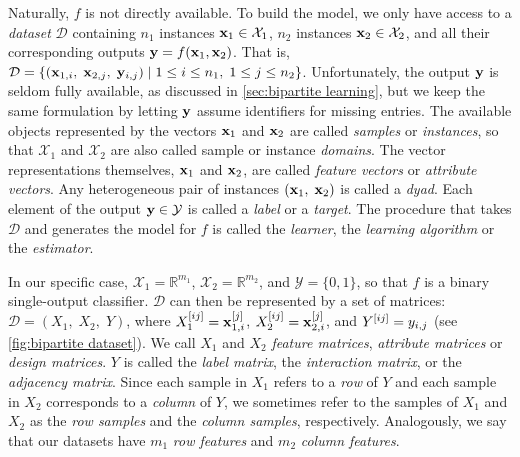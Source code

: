 Naturally, $f$ is not directly available. To build the model,
we only have access to a \emph{dataset} $\mathcal{D}$ containing $n_1$ instances $\mathbf{x}_{1} \in \mathcal{X}_1$, $n_2$ instances $\mathbf{x}_{2} \in \mathcal{X}_2$, and all their corresponding outputs $\mathbf{y} = f(\mathbf{x}_1, \mathbf{x}_2)$. That is,
$\mathcal{D} = \{(\mathbf{x}_{1,i}, \; \mathbf{x}_{2,j},\; \mathbf{y}_{i,j} ) \mid 1 \le i \le n_1,\; 1 \le j \le n_2\}$.
%
Unfortunately, the output $\mathbf{y}$ is seldom fully available, as discussed in \autoref{sec:bipartite learning}, but we keep the same formulation by letting $\mathbf{y}$ assume identifiers for missing entries.
%
%
%
%
The available objects represented by the vectors $\mathbf{x}_1$ and $\mathbf{x}_2$ are called \emph{samples} or \emph{instances}, so that $\mathcal{X}_1$ and $\mathcal{X}_2$ are also called sample or instance \emph{domains}.
The vector representations themselves, $\mathbf{x}_1$ and $\mathbf{x}_2$, are called \emph{feature vectors} or \emph{attribute vectors}.
Any heterogeneous pair of instances $(\mathbf{x}_1,\; \mathbf{x}_2)$ is called a \emph{dyad}.
Each element of the output $\mathbf{y} \in \mathcal{Y}$ is called a \emph{label} or a \emph{target}.
%
The procedure that takes $\mathcal{D}$ and generates the model for $f$ is called the \emph{learner}, the \emph{learning algorithm} or the \emph{estimator}.

In our specific case, $\mathcal{X}_1 = \mathbb R^{m_1}$, $\mathcal{X}_2 = \mathbb R^{m_2}$, and $\mathcal{Y} = \{0, 1\}$, so that $f$ is a binary single-output classifier.
%
$\mathcal{D}$ can then be represented by a set of matrices: $\mathcal{D} = (X_1,\; X_2,\;Y)$, where $X_1^{[ij]}=\mathbf{x}^{[j]}_{1,i}$, $X_2^{[ij]}=\mathbf{x}^{[j]}_{2,i}$, and $Y^{[ij]}=y_{i,j}$ (see \autoref{fig:bipartite dataset}).
We call $X_1$ and $X_2$ \emph{feature matrices}, \emph{attribute matrices} or \emph{design matrices}. $Y$ is called the \emph{label matrix}, the \emph{interaction matrix}, or the \emph{adjacency matrix}.
%
Since each sample in $X_1$ refers to a \emph{row} of $Y$ and each sample in $X_2$ corresponds to a \emph{column} of $Y$, we sometimes refer to the samples of $X_1$ and $X_2$ as the \emph{row samples} and the \emph{column samples}, respectively. Analogously, we say that our datasets have $m_1$ \emph{row features} and $m_2$ \emph{column features}.

